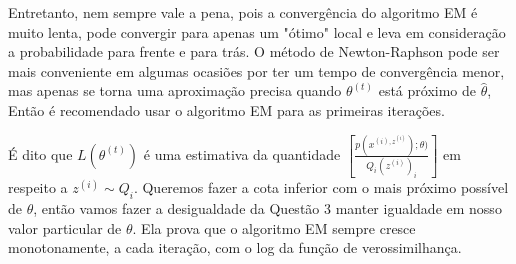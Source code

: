 \documentclass[a4paper,10pt, notitlepage]{report}
\begin{document}
\begin{enumerate}
		Entretanto, nem sempre vale a pena, pois a convergência do algoritmo EM é muito lenta, pode convergir para apenas um "ótimo" local e leva em consideração a probabilidade para frente e para trás. O método de Newton-Raphson pode ser mais conveniente em algumas ocasiões por ter um tempo de convergência menor, mas apenas se torna uma aproximação precisa quando $\theta^{(t)}$ está próximo de $\hat{\theta}$, Então é recomendado usar o algoritmo EM para as primeiras iterações.
		
		É dito que $L(\theta^{(t)})$ é uma estimativa da quantidade $\left[\frac{p(x^{(i),z^{(i)}}); \theta)}{{Q_i(z^{(i)})}_i}\right]$ em respeito a $z^{(i)} \sim Q_i$. Queremos fazer a cota inferior com o mais próximo possível de $\theta$, então vamos fazer a desigualdade da Questão 3 manter igualdade em nosso valor particular de $\theta$. Ela prova que o algoritmo EM sempre cresce monotonamente, a cada iteração, com o log da função de verossimilhança.
		
	\end{enumerate}
	
	
\end{document}
